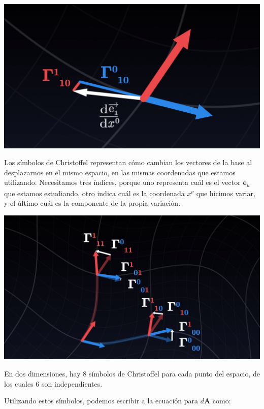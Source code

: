 \begin{marginfigure}
\captionsetup{type=figure}
    \centering
    \includegraphics[width=1.3\textwidth]{Im/christoffel.png}
    \caption{Los símbolos de Christoffel representan cómo cambian los vectores de la base al desplazarnos en el mismo espacio, en las mismas coordenadas que estamos utilizando. Necesitamos tres índices, porque uno representa cuál es el vector $\mathbf{e}_{\mu}$ que estamos estudiando, otro indica cuál es la coordenada $x^{\nu}$ que hicimos variar, y el último cuál es la componente de la propia variación.}
    \label{fig:sen}
\end{marginfigure}

\begin{marginfigure}
\captionsetup{type=figure}
    \centering
    \includegraphics[width=1.3\textwidth]{Im/muchoscristoffel.png}
    \caption{En dos dimensiones, hay 8 símbolos de Christoffel para cada punto del espacio, de los cuales 6 son independientes.}
    \label{fig:sen}
\end{marginfigure}

Utilizando estos símbolos, podemos escribir a la ecuación para $d\mathbf{A}$ como:

